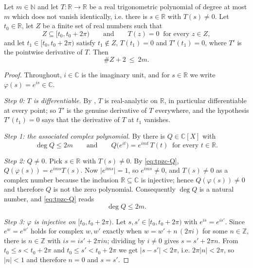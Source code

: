 \begin{lemma}
Let $m\in\mathbb{N}$ and let $T:\mathbb{R}\to\mathbb{R}$ be a real
trigonometric polynomial of degree at most $m$ which does not vanish
identically, i.e. there is $s\in\mathbb{R}$ with $T(s)\ne0$. Let
$t_0\in\mathbb{R}$, let $Z$ be a finite set of real numbers such that
\[
  Z\subseteq[t_0,t_0+2\pi)
  \qquad\text{and}\qquad
  T(z)=0\ \text{ for every }z\in Z,
\]
and let $t_1\in[t_0,t_0+2\pi)$ satisfy $t_1\notin Z$, $T(t_1)=0$ and
$T'(t_1)=0$, where $T'$ is the pointwise derivative of $T$. Then
\[
  \#Z+2\ \le\ 2m .
\]
\end{lemma}
\begin{proof}
Throughout, $i\in\mathbb{C}$ is the imaginary unit, and for $s\in\mathbb{R}$ we
write $\varphi(s)=e^{is}\in\mathbb{C}$.

\emph{Step 0: $T$ is differentiable.} By , $T$ is
real-analytic on $\mathbb{R}$, in particular differentiable at every point; so
$T'$ is the genuine derivative of $T$ everywhere, and the hypothesis
$T'(t_1)=0$ says that the derivative of $T$ at $t_1$ vanishes.

\emph{Step 1: the associated complex polynomial.} By
 there is $Q\in\mathbb{C}[X]$ with
\begin{equation}\label{eq:tpzc-Q}
  \deg Q\le 2m
  \qquad\text{and}\qquad
  Q\bigl(e^{it}\bigr)=e^{imt}\,T(t)\ \text{ for every }t\in\mathbb{R}.
\end{equation}

\emph{Step 2: $Q\ne0$.} Pick $s\in\mathbb{R}$ with $T(s)\ne0$. By
\eqref{eq:tpzc-Q}, $Q(\varphi(s))=e^{ims}T(s)$. Now
$\bigl\lvert e^{ims}\bigr\rvert=1$, so $e^{ims}\ne0$, and $T(s)\ne0$ as a
complex number because the inclusion $\mathbb{R}\subseteq\mathbb{C}$ is
injective; hence $Q(\varphi(s))\ne0$ and therefore $Q$ is not the zero
polynomial. Consequently $\deg Q$ is a natural number, and \eqref{eq:tpzc-Q}
reads
\begin{equation}\label{eq:tpzc-deg}
  \deg Q\le 2m .
\end{equation}

\emph{Step 3: $\varphi$ is injective on $[t_0,t_0+2\pi)$.} Let
$s,s'\in[t_0,t_0+2\pi)$ with $e^{is}=e^{is'}$. Since $e^{w}=e^{w'}$ holds for
complex $w,w'$ exactly when $w=w'+n\,(2\pi i)$ for some $n\in\mathbb{Z}$, there
is $n\in\mathbb{Z}$ with $is=is'+2\pi i n$; dividing by $i\ne0$ gives
$s=s'+2\pi n$. From $t_0\le s<t_0+2\pi$ and $t_0\le s'<t_0+2\pi$ we get
$\lvert s-s'\rvert<2\pi$, i.e. $2\pi\lvert n\rvert<2\pi$, so $\lvert n\rvert<1$
and therefore $n=0$ and $s=s'$.


\end{proof}

